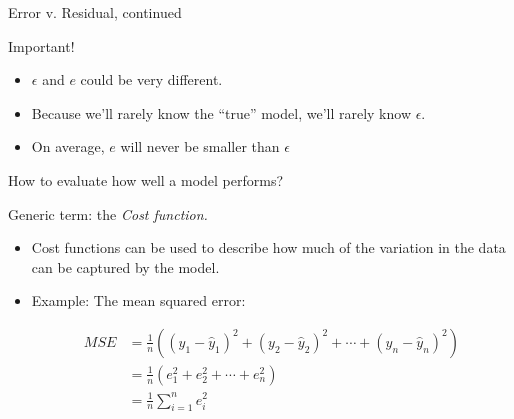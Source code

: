 \documentclass[aspectratio=169, handout]{beamer}
\begin{document}
\begin{frame}{Error v. Residual, continued}

Important!  
\begin{itemize}
\item $\epsilon$ and $e$ could be very different.  
\item Because we'll rarely know the ``true'' model, we'll rarely know $\epsilon$.
\item On average, $e$ will never be smaller than $\epsilon$
\end{itemize}
\end{frame}

\begin{frame}{How to evaluate how well a model performs?}

Generic term: the \textit{Cost function.}

\begin{itemize}
\item Cost functions can be used to describe how much of the variation in the data can be captured by the model.
\item Example: The mean squared error:

\begin{align*}
MSE &= \frac{1}{n} ((y_1 - \hat{y}_1)^2 + (y_2 - \hat{y}_2)^2 + \cdots + (y_n - \hat{y}_n)^2) \\
&= \frac{1}{n} (e_1^2 + e_2^2 + \cdots + e_n^2) \\
&=\frac{1}{n} \sum_{i=1}^n e_i^2
\end{align*}
\end{itemize}

\end{frame}
\end{document}
